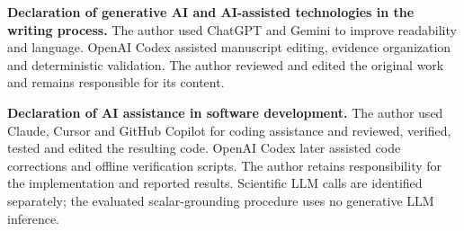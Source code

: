 \documentclass[pdflatex,iicol,sn-basic,Numbered]{sn-jnl}
\begin{document}
\noindent\textbf{Declaration of generative AI and AI-assisted technologies in the writing process.} The author used ChatGPT and Gemini to improve readability and language. OpenAI Codex assisted manuscript editing, evidence organization and deterministic validation. The author reviewed and edited the original work and remains responsible for its content.

\noindent\textbf{Declaration of AI assistance in software development.} The author used Claude, Cursor and GitHub Copilot for coding assistance and reviewed, verified, tested and edited the resulting code. OpenAI Codex later assisted code corrections and offline verification scripts. The author retains responsibility for the implementation and reported results. Scientific LLM calls are identified separately; the evaluated scalar-grounding procedure uses no generative LLM inference.


\end{document}
